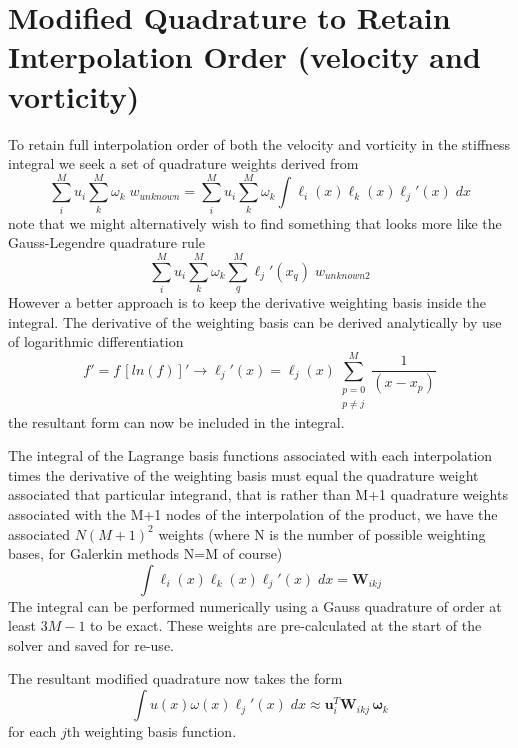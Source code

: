 \documentclass[letterpaper,12pt]{report}
\newcommand{\be}{\begin{equation}}
\newcommand{\ben}[1]{\begin{equation}\label{#1}}
\newcommand{\ee}{\end{equation}}
\begin{document}
\section{Modified Quadrature to Retain Interpolation Order (velocity and vorticity)}\label{ModQuad}
To retain full interpolation order of both the velocity and vorticity in the stiffness integral we seek a set of quadrature weights derived from
\be \sum_i^M u_i \sum_k^M \omega_k \;w_{unknown} = \sum_i^M u_i \sum_k^M \omega_k \int \ell_i(x) \ell_k(x) \ell_j'(x) \;dx \ee
note that we might alternatively wish to find something that looks more like the Gauss-Legendre quadrature rule
\be \sum_i^M u_i \sum_k^M \omega_k \sum_q^M \ell_j'(x_q) \;w_{unknown2} \ee
However a better approach is to keep the derivative weighting basis inside the integral.
The derivative of the weighting basis can be derived analytically by use of logarithmic differentiation
\be f' = f \, [ln(f)]' \rightarrow \ell_j'(x)=\ell_j(x) \sum_{\substack{p=0\\ p\neq j}}^M \frac{1}{(x-x_p)} \ee
the resultant form can now be included in the integral.

The integral of the Lagrange basis functions associated with each interpolation times the derivative of the weighting basis must equal the quadrature weight associated that particular integrand, that is rather than M+1  quadrature weights associated with the M+1 nodes of the interpolation of the product, we have the associated $N(M+1)^2$ weights (where N is the number of possible weighting bases, for Galerkin methods N=M of course)
\be \int \ell_i(x) \ell_k(x) \ell_j'(x) \;dx = \mathbf{W}_{ikj} \ee
The integral can be performed numerically using a Gauss quadrature of order at least $3M-1$ to be exact. These weights are pre-calculated at the start of the solver and saved for re-use.

The resultant modified quadrature now takes the form
\ben{modQuad} \int u(x) \omega(x) \ell_j'(x) \;dx \approx \mathbf{u}_i^T \mathbf{W}_{ikj} \, \boldsymbol{\omega}_k \ee
for each $j$th weighting basis function.
\end{document}
